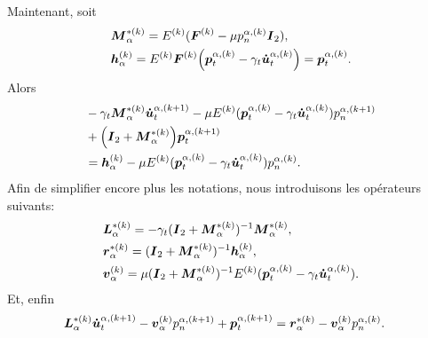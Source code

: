 \noindent Maintenant, soit
\begin{align*}
&\mbox{\boldmath{$M$}}_{\alpha}^{*(k)}=E^{(k)}(\mbox{\boldmath{$F$}}^{(k)} - \mu  p^{\alpha,(k)}_n\mbox{\boldmath{$I$}}_2),\\
&\mbox{\boldmath{$h$}}_{\alpha}^{(k)}=E^{(k)}\mbox{\boldmath{$F$}}^{(k)} \Big(\boldsymbol{p}^{\alpha,(k)}_t - \gamma_t \boldsymbol{\dot{u}}^{\alpha,(k)}_t\Big)=\boldsymbol{p}^{\alpha,(k)}_t .
\end{align*}
Alors
\begin{align*}
&- \gamma_t \mbox{\boldmath{$M$}}_{\alpha}^{*(k)}\boldsymbol{\dot{u}}^{\alpha,(k+1)}_t - \mu E^{(k)} (\boldsymbol{p}^{\alpha,(k)}_t - \gamma_t \boldsymbol{\dot{u}}^{\alpha,(k)}_t)p^{\alpha,(k+1)}_n\\
& +\Big(\mbox{\boldmath{$I$}}_2+\mbox{\boldmath{$M$}}_{\alpha}^{*(k)}  \Big)\boldsymbol{p}^{\alpha,(k+1)}_t\\
& =\mbox{\boldmath{$h$}}_{\alpha}^{(k)} - \mu E^{(k)} (\boldsymbol{p}^{\alpha,(k)}_t - \gamma_t \boldsymbol{\dot{u}}^{\alpha,(k)}_t)p^{\alpha,(k)}_n \nonumber.
\end{align*}
\noindent Afin de simplifier encore plus les notations, nous introduisons les opérateurs suivants:
\begin{align*}
&\mbox{\boldmath{$L$}}_{\alpha}^{*(k)}=- \gamma_t(\mbox{\boldmath{$I$}}_2+ \mbox{\boldmath{$M$}}_{\alpha}^{*(k)})^{-1}\mbox{\boldmath{$M$}}_{\alpha}^{*(k)},\\
&\mbox{\boldmath{$r$}}_{\alpha}^{*(k)}=(\mbox{\boldmath{$I$}}_2+ \mbox{\boldmath{$M$}}_{\alpha}^{*(k)})^{-1}\mbox{\boldmath{$h$}}_{\alpha}^{(k)},\\
&\mbox{\boldmath{$v$}}_{\alpha}^{(k)}=\mu(\mbox{\boldmath{$I$}}_2+ \mbox{\boldmath{$M$}}_{\alpha}^{*(k)})^{-1}E^{(k)} (\boldsymbol{p}^{\alpha,(k)}_t - \gamma_t \boldsymbol{\dot{u}}^{\alpha,(k)}_t).
\end{align*}
\noindent Et, enfin
\begin{align*}
&\mbox{\boldmath{$L$}}_{\alpha}^{*(k)}\boldsymbol{\dot{u}}^{\alpha,(k+1)}_t- \mbox{\boldmath{$v$}}_{\alpha}^{(k)}p^{\alpha,(k+1)}_n+ \boldsymbol{p}^{\alpha,(k+1)}_t= \mbox{\boldmath{$r$}}_{\alpha}^{*(k)} - \mbox{\boldmath{$v$}}_{\alpha}^{(k)}p^{\alpha,(k)}_n.
\end{align*}

